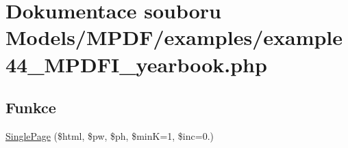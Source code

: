 \hypertarget{example44___m_p_d_f_i__yearbook_8php}{\section{Dokumentace souboru Models/\-M\-P\-D\-F/examples/example44\-\_\-\-M\-P\-D\-F\-I\-\_\-yearbook.php}
\label{example44___m_p_d_f_i__yearbook_8php}
}
\subsection*{Funkce}
\begin{DoxyCompactItemize}
\item 
\hyperlink{example44___m_p_d_f_i__yearbook_8php_af97df179cd8a0f2cbe0e88a84250efdd}{Single\-Page} (\$html, \$pw, \$ph, \$min\-K=1, \$inc=0.)
\end{DoxyCompactItemize}

